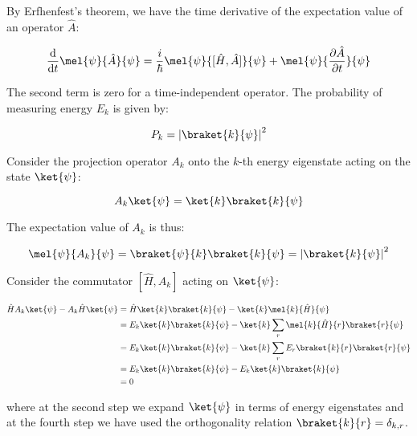 \documentclass[12pt]{article}
\begin{document}
By Erfhenfest's theorem, we have the time derivative of the expectation value of an operator $\hat{A}$:

\begin{equation}
    \frac{\mathrm{d}}{\mathrm{d}t} \mel{\psi}{\hat{A}}{\psi} = \frac{i}{\hbar} \mel{\psi}{[\hat{H}, \hat{A}]}{\psi} + \mel{\psi}{\frac{\partial \hat{A}}{\partial t}}{\psi}
\end{equation}

The second term is zero for a time-independent operator. The probability of measuring energy $E_{k}$ is given by:

\begin{equation}
    P_{k} = \left\lvert \braket{k}{\psi} \right\rvert^{2}
\end{equation}

Consider the projection operator $A_{k}$ onto the $k$-th energy eigenstate acting on the state $\ket{\psi}$:

\begin{equation}
    A_{k} \ket{\psi} = \ket{k} \braket{k}{\psi}
\end{equation}

The expectation value of $A_{k}$ is thus:

\begin{equation}
    \mel{\psi}{A_{k}}{\psi} = \braket{\psi}{k} \braket{k}{\psi} = \left\lvert \braket{k}{\psi} \right\rvert^{2}
\end{equation}

Consider the commutator $[\hat{H}, A_{k}]$ acting on $\ket{\psi}$:

\begin{equation}
\begin{split}
    \hat{H} A_{k} \ket{\psi} - A_{k} \hat{H} \ket{\psi} &= \hat{H} \ket{k} \braket{k}{\psi} - \ket{k} \mel{k}{\hat{H}}{\psi} \\
    &= E_{k} \ket{k} \braket{k}{\psi} - \ket{k} \sum_{r} \mel{k}{\hat{H}}{r} \braket{r}{\psi} \\
    &= E_{k} \ket{k} \braket{k}{\psi} - \ket{k} \sum_{r} E_{r} \braket{k}{r} \braket{r}{\psi} \\
    &= E_{k} \ket{k} \braket{k}{\psi} - E_{k} \ket{k} \braket{k}{\psi} \\
    &= 0
\end{split}
\end{equation}

where at the second step we expand $\ket{\psi}$ in terms of energy eigenstates and at the fourth step we have used the orthogonality relation $\braket{k}{r} = \delta_{k, r}$.
\end{document}
